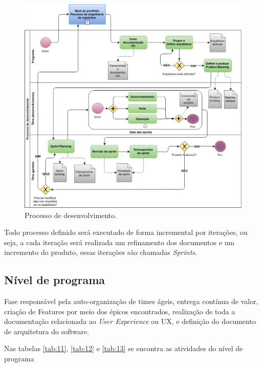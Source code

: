 \begin{figure}[h!]
	\centering
  \includegraphics[keepaspectratio=true,scale=0.5]{figuras/desenvolvimento.eps}
  \caption{Processo de desenvolvimento.}
	\label{fig:desenvolvimento}
\end{figure}

Todo processo definido será executado de forma incremental por iterações, ou seja, a cada iteração será realizada um
refinamento dos documentos e um incremento do produto, essas iterações são chamadas \textit{Sprints}.

\subsection{Nível de programa}

Fase responsável pela auto-organização de times ágeis, entrega contínua de valor, criação de Features por meio dos épicos encontrados, realização de toda a documentação relacionada ao \textit{User Experience} ou UX, e definição do documento de arquitetura do software.

Nas tabelas \ref{tab:11}, \ref{tab:12} e \ref{tab:13} se encontra as atividades do nível de programa

